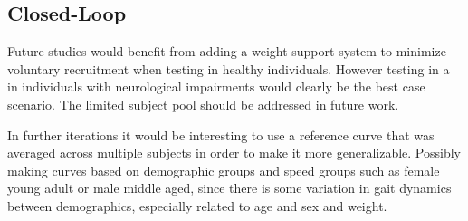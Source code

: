 \subsection{Closed-Loop}
Future studies would benefit from adding a weight support system to minimize voluntary recruitment when testing in healthy individuals. However testing in a in individuals with neurological impairments would clearly be the best case scenario. The limited subject pool should be addressed in future work.

In further iterations it would be interesting to use a reference curve that was averaged across multiple subjects in order to make it more generalizable. Possibly making curves based on demographic groups and speed groups such as female young adult or male middle aged, since there is some variation in gait dynamics between demographics, especially related to age and sex and weight.

